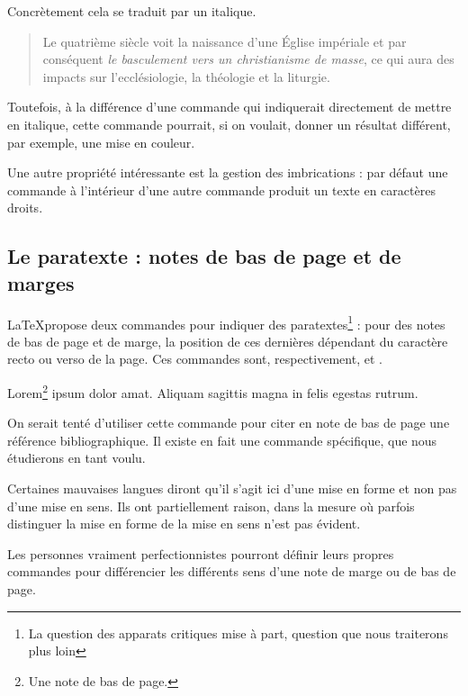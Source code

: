 Concrètement cela se traduit par un italique. 

\begin{quotation}
Le quatrième siècle voit la naissance d'une Église impériale et par conséquent \emph{le basculement vers un christianisme de masse}, ce qui aura des impacts sur l'ecclésiologie, la théologie et la liturgie.
\end{quotation}

Toutefois, à la différence d'une commande qui indiquerait directement de mettre en italique, cette commande pourrait, si on voulait, donner un résultat différent, par exemple, une mise en couleur. 

Une autre propriété intéressante est la gestion des imbrications : par défaut une commande  à l'intérieur d'une autre commande  produit un texte en caractères droits.

\subsection{Le paratexte : notes de bas de page et de marges}

\LaTeX propose deux commandes pour indiquer des paratextes\footnote{La question des apparats critiques mise à part, question que nous traiterons plus loin} : pour des notes de bas de page et de marge, la position de ces dernières dépendant du caractère recto ou verso de la page. Ces commandes sont, respectivement,  et .

\begin{latexcode}
Lorem\footnote{Une note de bas de page.} ipsum dolor amat.
Aliquam sagittis magna in felis egestas rutrum.
\end{latexcode}

\begin{attention}
    On serait tenté d'utiliser cette commande pour citer en note de bas de page une référence bibliographique. Il existe en fait une commande spécifique, que nous étudierons en tant voulu.
\end{attention}
\begin{attention}
    Certaines mauvaises langues diront qu'il s'agit ici d'une mise en forme et non pas d'une mise en sens. Ils ont partiellement raison, dans la mesure où parfois distinguer la mise en forme de la mise en sens n'est pas évident.
    
    Les personnes vraiment perfectionnistes pourront définir leurs propres commandes pour différencier les différents sens d'une note de marge ou de bas de page.
\end{attention}

